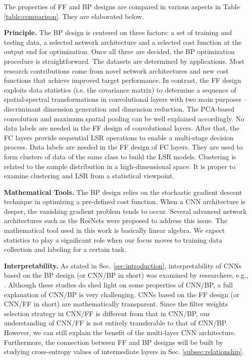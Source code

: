 \documentclass[preprint,12pt]{elsarticle}
\begin{document}
The properties of FF and BP designs are compared in various aspects in
Table \ref{table:comparison}. They are elaborated below. 

{\bf Principle.} The BP design is centered on three factors: a set of
training and testing data, a selected network architecture and a
selected cost function at the output end for optimization. Once all
three are decided, the BP optimization procedure is straightforward. The
datasets are determined by applications.  Most research contributions
come from novel network architectures and new cost functions that
achieve improved target performance.  In contrast, the FF design
exploits data statistics (i.e. the covariance matrix) to determine a
sequence of spatial-spectral transformations in convolutional layers
with two main purposes -- discriminant dimension generation and
dimension reduction. The PCA-based convolution and maximum spatial
pooling can be well explained accordingly. No data labels are needed in
the FF design of convolutional layers. After that, the FC layers provide
sequential LSR operations to enable a multi-stage decision process. Data
labels are needed in the FF design of FC layers.  They are used to form
clusters of data of the same class to build the LSR models. Clustering
is related to the sample distribution in a high-dimensional space. It is
proper to examine clustering and LSR from a statistical viewpoint. 

{\bf Mathematical Tools.} The BP design relies on the stochastic
gradient descent technique in optimizing a pre-defined cost function.
When a CNN architecture is deeper, the vanishing gradient problem tends
to occur. Several advanced network architectures such as the ResNets
\cite{He_2016_CVPR} were proposed to address this issue. The
mathematical tool used in this work is basically linear algebra.  We
expect statistics to play a significant role when our focus moves to
training data collection and labeling for a certain task. 

{\bf Interpretability.} As stated in Sec. \ref{sec:introduction},
interpretability of CNNs based on the BP design (or CNN/BP in short) was
examined by researchers, e.g., \cite{zhang2017interpretable,
wang2018interpret}.  Although these studies do shed light on some
properties of CNN/BP, a full explanation of CNN/BP is very challenging.
CNNs based on the FF design (or CNN/FF in short) are mathematically
transparent. Since the filter weights selection strategy in CNN/FF is
different from that in CNN/BP, our understanding of CNN/FF is not
entirely transferable to that of CNN/BP. However, we can still explain
the benefit of the multi-layer CNN architecture. Furthermore, the
connection between FF and BP designs will be built by studying
cross-entropy values of intermediate layers in Sec.
\ref{subsec:relationship}. 
\end{document}
